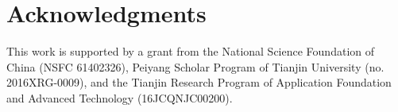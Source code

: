 \documentclass[journal,transmag]{IEEEtran}
\begin{document}
\section*{Acknowledgments}
This work is supported by a grant from the National Science
Foundation of China (NSFC 61402326), Peiyang Scholar Program of
Tianjin University (no. 2016XRG-0009), and the Tianjin Research
Program of Application Foundation and Advanced Technology
(16JCQNJC00200).






%
%
\end{document}
